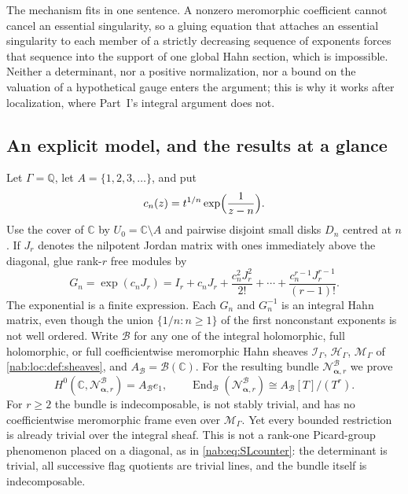 \documentclass[11pt,letterpaper]{article}
\theoremstyle{definition}
\theoremstyle{remark}
\newcommand{\C}{\mathbb C}
\newcommand{\Q}{\mathbb Q}
\newcommand{\HH}{\mathscr H_\Gamma}
\newcommand{\II}{\mathscr I_\Gamma}
\newcommand{\MM}{\mathscr M_\Gamma}
\newcommand{\BB}{\mathscr B}
\newcommand{\Aglob}{A_{\BB}}
\newcommand{\End}{\operatorname{End}}
\newcommand{\profile}{\boldsymbol\alpha}
\newcommand{\NN}[1]{\mathcal N_{\profile,#1}}
\numberwithin{equation}{section}
\begin{document}
The mechanism fits in one sentence. A nonzero meromorphic coefficient cannot
cancel an essential singularity, so a gluing equation that attaches an
essential singularity to each member of a strictly decreasing sequence of
exponents forces that sequence into the support of one global Hahn section,
which is impossible. Neither a determinant, nor a positive normalization, nor a
bound on the valuation of a hypothetical gauge enters the argument; this is
why it works after localization, where Part~I's integral argument does not.

\subsection{An explicit model, and the results at a glance}

Let $\Gamma=\Q$, let $A=\{1,2,3,\ldots\}$, and put
\begin{equation}\label{nab:loc:eq:headline-cocycle}
 c_n(z)=t^{1/n}\exp\Bigl(\frac{1}{z-n}\Bigr).
\end{equation}
Use the cover of $\C$ by $U_0=\C\setminus A$ and pairwise disjoint small disks
$D_n$ centred at $n$. If $J_r$ denotes the nilpotent Jordan matrix with ones
immediately above the diagonal, glue rank-$r$ free modules by
\begin{equation}\label{nab:loc:eq:headline-transition}
 G_n=\exp(c_nJ_r)
     =I_r+c_nJ_r+\frac{c_n^2J_r^2}{2!}
       +\cdots+\frac{c_n^{r-1}J_r^{r-1}}{(r-1)!}.
\end{equation}
The exponential is a finite expression. Each $G_n$ and $G_n^{-1}$ is an
integral Hahn matrix, even though the union $\{1/n:n\geq1\}$ of the first
nonconstant exponents is not well ordered. Write $\BB$ for any one of the
integral holomorphic, full holomorphic, or full coefficientwise meromorphic
Hahn sheaves $\II$, $\HH$, $\MM$ of \cref{nab:loc:def:sheaves}, and
$\Aglob=\BB(\C)$. For the resulting bundle $\NN r^{\BB}$ we prove
\begin{equation}\label{nab:loc:eq:headline-sections}
 H^0(\C,\NN r^{\BB})=\Aglob e_1,
 \qquad
 \End_{\BB}(\NN r^{\BB})\cong\Aglob[T]/(T^r).
\end{equation}
For $r\geq2$ the bundle is indecomposable, is not stably trivial, and has no
coefficientwise meromorphic frame even over $\MM$. Yet every bounded
restriction is already trivial over the integral sheaf. This is not a rank-one
Picard-group phenomenon placed on a diagonal, as in \eqref{nab:eq:SLcounter}:
the determinant is trivial, all successive flag quotients are trivial lines,
and the bundle itself is indecomposable.
\end{document}
